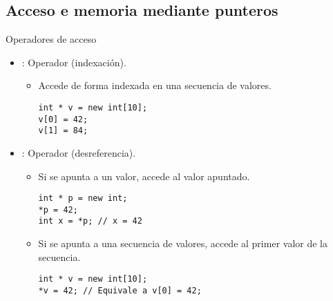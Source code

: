 \subsection{Acceso e memoria mediante punteros}

\begin{frame}[t,fragile]{Operadores de acceso}
\begin{itemize}
  \item {}: Operador \cppkey{[]} (indexación).
    \begin{itemize}
      \item Accede de forma indexada en una secuencia de valores.
\begin{lstlisting}
int * v = new int[10];
v[0] = 42;
v[1] = 84;
\end{lstlisting}
    \end{itemize}

  \item {}: Operador \cppkey{*} (desreferencia).
    \begin{itemize}
      \item Si se apunta a un valor, accede al valor apuntado.
\begin{lstlisting}
int * p = new int;
*p = 42;
int x = *p; // x = 42
\end{lstlisting}


      \item Si se apunta a una secuencia de valores, accede al primer valor de la secuencia.
\begin{lstlisting}
int * v = new int[10];
*v = 42; // Equivale a v[0] = 42;
\end{lstlisting}
    \end{itemize}
\end{itemize}
\end{frame}


